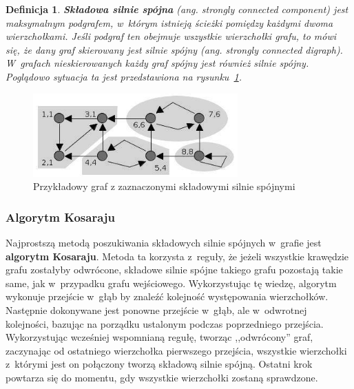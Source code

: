\documentclass[twoside,12pt]{report}
\newtheorem{definition}{Definicja} %
\begin{document}
\begin{definition}
\textbf{Składowa silnie spójna} (ang. strongly connected component) jest maksymalnym podgrafem, w~którym istnieją ścieżki pomiędzy każdymi dwoma wierzchołkami. Jeśli podgraf ten obejmuje wszystkie wierzchołki grafu, to mówi się, że dany graf skierowany jest silnie spójny (ang. strongly connected digraph). W~grafach nieskierowanych każdy graf spójny jest również silnie spójny. Poglądowo sytuacja ta jest przedstawiona na rysunku~\ref{fig:ex_silnie_spojna}.
\end{definition}

\begin{figure}[htbp]
	\centering
	\includegraphics[width=0.7\textwidth]{img/tajran}
	\caption{Przykładowy graf z zaznaczonymi składowymi silnie spójnymi}
	\label{fig:ex_silnie_spojna}
\end{figure}

\subsubsection{Algorytm Kosaraju}
Najprostszą metodą poszukiwania składowych silnie spójnych w~grafie jest \textbf{algorytm Kosaraju}. Metoda ta korzysta z~reguły, że jeżeli wszystkie krawędzie grafu zostałyby odwrócone, składowe silnie spójne takiego grafu pozostają takie same, jak w~przypadku grafu wejściowego. Wykorzystując tę wiedzę, algorytm wykonuje przejście w~głąb by znaleźć kolejność występowania wierzchołków. Następnie dokonywane jest ponowne przejście w~głąb, ale w~odwrotnej kolejności, bazując na porządku ustalonym podczas poprzedniego przejścia. Wykorzystując wcześniej wspomnianą regułę, tworząc ,,odwrócony'' graf, zaczynając od ostatniego wierzchołka pierwszego przejścia, wszystkie wierzchołki z~którymi jest on połączony tworzą składową silnie spójną. Ostatni krok powtarza się do momentu, gdy wszystkie wierzchołki zostaną sprawdzone.
\end{document}
